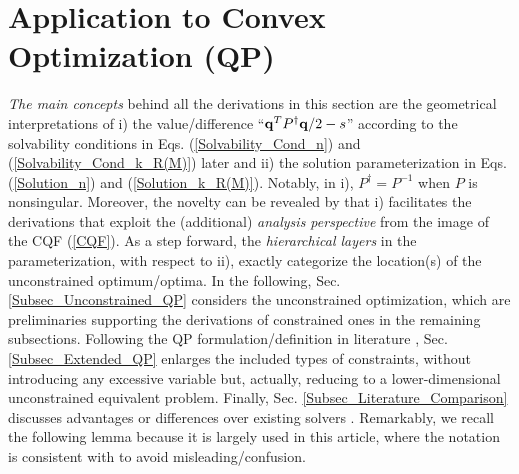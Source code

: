 \documentclass{imaman}
\newcommand{\bfq}{{\bf q}}
\numberwithin{equation}{section}
\begin{document}
\section{Application to Convex Optimization (QP)}
\label{Sec_Convex_Optimization}
\textit{The main concepts} behind all the derivations in this section are the geometrical interpretations of i) the value/difference ``$\bfq^TP^\dagger\bfq/2-s$'' according to the solvability conditions in Eqs. (\ref{Solvability_Cond_n}) and (\ref{Solvability_Cond_k_R(M)}) later and ii) the solution parameterization in Eqs. (\ref{Solution_n}) and (\ref{Solution_k_R(M)}). Notably, in i), $P^\dagger=P^{-1}$ when $P$ is nonsingular. Moreover, the novelty can be revealed by that i) facilitates the derivations that exploit the (additional) \textit{analysis perspective} from the image of the CQF (\ref{CQF}). As a step forward, the \textit{hierarchical layers} in the parameterization, with respect to ii), exactly categorize the location(s) of the unconstrained optimum/optima. In the following, Sec. \ref{Subsec_Unconstrained_QP} considers the unconstrained optimization, which are preliminaries supporting the derivations of constrained ones in the remaining subsections. Following the QP formulation/definition in literature \citep{BoVa:04,Lu(Ye):03(16)}, Sec. \ref{Subsec_Extended_QP} enlarges the included types of constraints, without introducing any excessive variable but, actually, reducing to a lower-dimensional unconstrained equivalent problem. Finally, Sec. \ref{Subsec_Literature_Comparison} discusses advantages or differences over existing solvers \citep{NoWr:06}. Remarkably, we recall the following lemma because it is largely used in this article, where the notation is consistent with \cite{LiLiHs:draft,LiLiHs:20} to avoid misleading/confusion.
\end{document}
